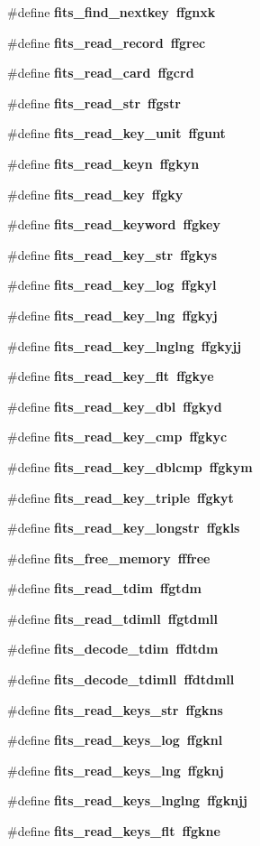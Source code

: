 \begin{CompactItemize}
\item 
\#define \bf{fits\_\-find\_\-nextkey}~ffgnxk
\item 
\#define \bf{fits\_\-read\_\-record}~ffgrec
\item 
\#define \bf{fits\_\-read\_\-card}~ffgcrd
\item 
\#define \bf{fits\_\-read\_\-str}~ffgstr
\item 
\#define \bf{fits\_\-read\_\-key\_\-unit}~ffgunt
\item 
\#define \bf{fits\_\-read\_\-keyn}~ffgkyn
\item 
\#define \bf{fits\_\-read\_\-key}~ffgky
\item 
\#define \bf{fits\_\-read\_\-keyword}~ffgkey
\item 
\#define \bf{fits\_\-read\_\-key\_\-str}~ffgkys
\item 
\#define \bf{fits\_\-read\_\-key\_\-log}~ffgkyl
\item 
\#define \bf{fits\_\-read\_\-key\_\-lng}~ffgkyj
\item 
\#define \bf{fits\_\-read\_\-key\_\-lnglng}~ffgkyjj
\item 
\#define \bf{fits\_\-read\_\-key\_\-flt}~ffgkye
\item 
\#define \bf{fits\_\-read\_\-key\_\-dbl}~ffgkyd
\item 
\#define \bf{fits\_\-read\_\-key\_\-cmp}~ffgkyc
\item 
\#define \bf{fits\_\-read\_\-key\_\-dblcmp}~ffgkym
\item 
\#define \bf{fits\_\-read\_\-key\_\-triple}~ffgkyt
\item 
\#define \bf{fits\_\-read\_\-key\_\-longstr}~ffgkls
\item 
\#define \bf{fits\_\-free\_\-memory}~fffree
\item 
\#define \bf{fits\_\-read\_\-tdim}~ffgtdm
\item 
\#define \bf{fits\_\-read\_\-tdimll}~ffgtdmll
\item 
\#define \bf{fits\_\-decode\_\-tdim}~ffdtdm
\item 
\#define \bf{fits\_\-decode\_\-tdimll}~ffdtdmll
\item 
\#define \bf{fits\_\-read\_\-keys\_\-str}~ffgkns
\item 
\#define \bf{fits\_\-read\_\-keys\_\-log}~ffgknl
\item 
\#define \bf{fits\_\-read\_\-keys\_\-lng}~ffgknj
\item 
\#define \bf{fits\_\-read\_\-keys\_\-lnglng}~ffgknjj
\item 
\#define \bf{fits\_\-read\_\-keys\_\-flt}~ffgkne

\end{CompactItemize}
